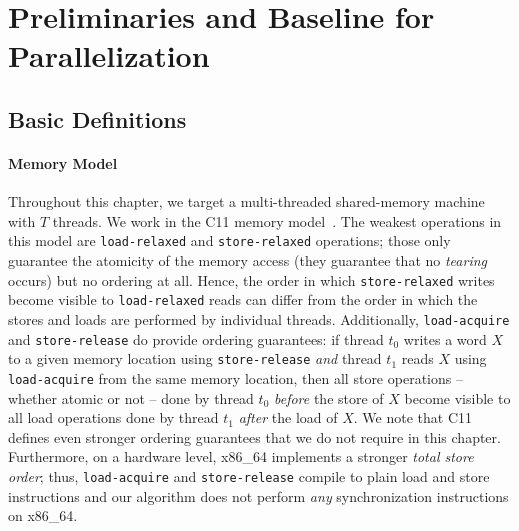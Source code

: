 \section{Preliminaries and Baseline for Parallelization}
%
\subsection{Basic Definitions}
\label{sec:betw-apx:basic-defs}
%
\paragraph{Memory Model}
%
Throughout this chapter, we target a multi-threaded shared-memory machine
with $T$ threads. We work in the C11 memory model~\cite{ISO2012III}.
The weakest operations in this model are \texttt{load-relaxed} and \texttt{store-relaxed}
operations; those only guarantee the atomicity of the memory access
(\ie they guarantee that no \emph{tearing} occurs)
but no ordering at all. Hence, the order in which \texttt{store-relaxed}
writes become visible to \texttt{load-relaxed} reads can differ from the
order in which the stores and loads are performed by individual threads.
Additionally, \texttt{load-acquire} and \texttt{store-release}
do provide ordering guarantees:
if thread $t_0$ writes a word $X$ to a given memory location using \texttt{store-release}
\emph{and} thread $t_1$ reads $X$ using \texttt{load-acquire} from the same memory location,
then all store operations -- whether atomic or not --
done by thread $t_0$ \emph{before} the store of $X$
become visible to all load operations done by thread $t_1$ \emph{after} the load of $X$.
We note that C11 defines even stronger ordering guarantees that we do not require in
this chapter.
Furthermore, on a hardware level, x86\_64 implements a stronger \emph{total store order};
thus, \texttt{load-acquire} and \texttt{store-release} compile to plain
load and store instructions and our \localframe algorithm does not perform \emph{any}
synchronization instructions on x86\_64.

